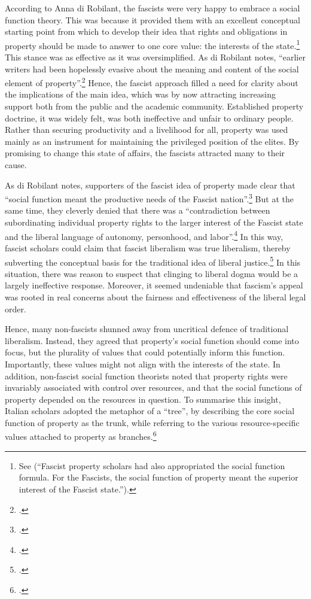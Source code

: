 According to Anna di Robilant, the fascists were very happy to embrace a social function theory. This was because it provided them with an excellent conceptual starting point from which to develop their idea that rights and obligations in property should be made to answer to one core value: the interests of the state.\footnote{See \cite[908-909]{robilant13} (``Fascist property scholars had also appropriated the social function formula. For the Fascists, the social function of property meant the superior interest of the Fascist state.'').} This stance was as effective as it was oversimplified. As di Robilant notes, ``earlier writers had been hopelessly evasive about the meaning and content of the social element of property''.\footcite[909]{robilant13} Hence, the fascist approach filled a need for clarity about the implications of the main idea, which was by now attracting increasing support both from the public and the academic community. Established property doctrine, it was widely felt, was both ineffective and unfair to ordinary people. Rather than securing productivity and a livelihood for all, property was used mainly as an instrument for maintaining the privileged position of the elites. By promising to change this state of affairs, the fascists attracted many to their cause.

As di Robilant notes, supporters of the fascist idea of property made clear that ``social function meant the productive needs of the Fascist nation''.\footcite[909]{robilant13} But at the same time, they cleverly denied that there was a ``contradiction between subordinating individual property rights to the larger interest of the Fascist state and the liberal language of autonomy, personhood, and labor''.\footcite[900]{robilant13} In this way, fascist scholars could claim that fascist liberalism was true liberalism, thereby subverting the conceptual basis for the traditional idea of liberal justice.\footcite[900]{robilant13} In this situation, there was reason to suspect that clinging to liberal dogma would be a largely ineffective response. Moreover, it seemed undeniable that fascism's appeal was rooted in real concerns about the fairness and effectiveness of the liberal legal order. 

Hence, many non-fascists shunned away from uncritical defence of traditional liberalism. Instead, they agreed that property's social function should come into focus, but  the plurality of values that could potentially inform this function. Importantly, these values might not align with the interests of the state. In addition, non-fascist social function theorists noted that property rights were invariably associated with control over resources, and that the social functions of property depended on the resources in question. 
To summarise this insight, Italian scholars adopted the metaphor of a ``tree'', by describing the core social function of property as the trunk, while referring to the various resource-specific values attached to property as branches.\footcite[894-916]{robilant13} %

